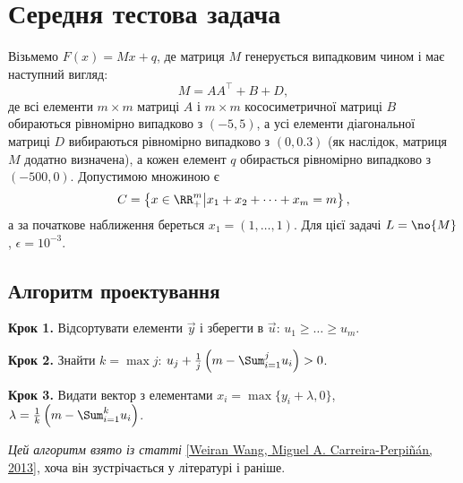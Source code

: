 \chapter{Середня тестова задача}

\begin{problem}
    Візьмемо $F(x) = M x + q$, де матриця $M$ генерується випадковим чином і має наступний  вигляд:
    \begin{equation}
        M = A A^\intercal + B + D,
    \end{equation}
    де всі елементи $m \times m$ матриці $A$ і $m \times m$ кососиметричної матриці $B$ обираються рівномірно випадково з $(-5, 5)$, а усі елементи діагональної матриці $D$ вибираються рівномірно випадково з $(0, 0.3)$ (як наслідок, матриця $M$ додатно визначена), а кожен елемент $q$ обирається рівномірно випадково з $(-500, 0)$. Допустимою множиною є 
    \begin{equation}
        C = \left\{ x \in \RR_+^m \middle| x_1 + x_2 + \dots + x_m = m \right\},
    \end{equation}
    а за початкове наближення береться $x_1 = (1, \dots, 1)$. Для цієї задачі $L = \no{M}$, $\epsilon = 10^{-3}$.
\end{problem}

\section{Алгоритм проектування}

\begin{algorithm}\nothing

    \textbf{Крок 1.} Відсортувати елементи $\vec y$ і зберегти в $\vec u$: $u_1 \ge \dots \ge u_m$. \medskip
        
    \textbf{Крок 2.} Знайти $k = \max j$: $u_j + \frac{1}{j} \left( m - \Sum_{i = 1}^j u_i \right) > 0$. \medskip
        
    \textbf{Крок 3.} Видати вектор з елементами $x_i = \max\{y_i + \lambda, 0\}$, $\lambda = \frac{1}{k} \left( m - \Sum_{i = 1}^k u_i \right)$.
\end{algorithm}

\emph{Цей алгоритм взято із статті} \href{https://arxiv.org/pdf/1309.1541v1.pdf}{[Weiran Wang, Miguel A. Carreira-Perpi\~n\'an, 2013]}, хоча він зустрічається у літературі і раніше.

